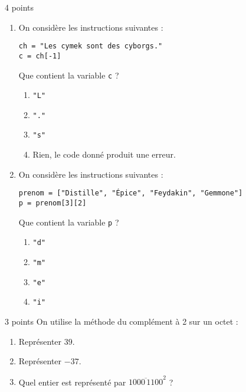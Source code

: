 \documentclass[a4paper,dvipsnames]{article}
\begin{document}
\begin{exercice}{4 points}{}
\begin{enumerate}
\begin{multicols}{2}
\begin{enumerate}
	  \item \texttt{[3, 4, 5, 6, 7]}
	  \item \texttt{[3, 4, 5, 6]}
        \end{enumerate}
      \end{multicols}
    \item On considère les instructions suivantes :
      \begin{verbatim}
ch = "Les cymek sont des cyborgs."
c = ch[-1]
      \end{verbatim}
      Que contient la variable \texttt{c} ?
      \vspace*{-2mm}
      \begin{multicols}{2}
        \begin{enumerate}
	  \item \texttt{"L"}
	  \item \texttt{"."}\columnbreak
	  \item \texttt{"s"}
	  \item Rien, le code donné produit une erreur.
        \end{enumerate}
      \end{multicols}
    \item On considère les instructions suivantes :
      \begin{verbatim}
prenom = ["Distille", "Épice", "Feydakin", "Gemmone"]
p = prenom[3][2]
      \end{verbatim}
      Que contient la variable \texttt{p} ?
      \vspace*{-2mm}
      \begin{multicols}{4}
        \begin{enumerate}
	  \item \texttt{"d"}
	  \item \texttt{"m"}
	  \item \texttt{"e"}
	  \item \texttt{"i"}
        \end{enumerate}
      \end{multicols}
  \end{enumerate}
\end{exercice}

\medskip

\begin{exercice}{3 points}{}
 On utilise la méthode du complément à 2 sur un octet :
 \begin{enumerate}
   \item Représenter $39$.
   \item Représenter $-37$. 
   \item Quel entier est représenté par $\overline{1000\,1100}^2$ ?
 \end{enumerate}
\end{exercice}
\end{document}

